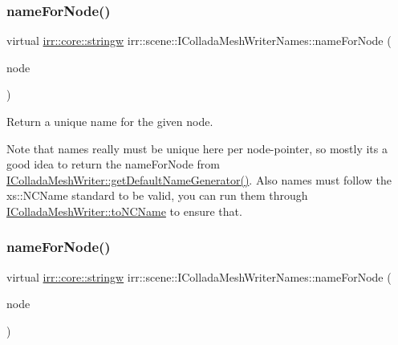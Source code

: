 \subsubsection{\texorpdfstring{name\+For\+Node()}{nameForNode()}\hspace{0.1cm}{\footnotesize\ttfamily [1/2]}}
{\footnotesize\ttfamily virtual \hyperlink{namespaceirr_1_1core_a5aedb62cb47cf01d1c548ab5e6344d2d}{irr\+::core\+::stringw} irr\+::scene\+::\+I\+Collada\+Mesh\+Writer\+Names\+::name\+For\+Node (\begin{DoxyParamCaption}\item[{const \hyperlink{classirr_1_1scene_1_1ISceneNode}{scene\+::\+I\+Scene\+Node} $\ast$}]{node }\end{DoxyParamCaption})\hspace{0.3cm}{\ttfamily [pure virtual]}}



Return a unique name for the given node. 

Note that names really must be unique here per node-\/pointer, so mostly it\textquotesingle{}s a good idea to return the name\+For\+Node from \hyperlink{classirr_1_1scene_1_1IColladaMeshWriter_acd10fcf2458271d59cf76284613288f6}{I\+Collada\+Mesh\+Writer\+::get\+Default\+Name\+Generator()}. Also names must follow the xs\+::\+N\+C\+Name standard to be valid, you can run them through \hyperlink{classirr_1_1scene_1_1IColladaMeshWriter_ac9c48beab095aa6f4cb4f696bb2ecd45}{I\+Collada\+Mesh\+Writer\+::to\+N\+C\+Name} to ensure that. \mbox{\label{classirr_1_1scene_1_1IColladaMeshWriterNames_a60d3fdad90edc25b0305c91be15b255f}} 
\subsubsection{\texorpdfstring{name\+For\+Node()}{nameForNode()}\hspace{0.1cm}{\footnotesize\ttfamily [2/2]}}
{\footnotesize\ttfamily virtual \hyperlink{namespaceirr_1_1core_a5aedb62cb47cf01d1c548ab5e6344d2d}{irr\+::core\+::stringw} irr\+::scene\+::\+I\+Collada\+Mesh\+Writer\+Names\+::name\+For\+Node (\begin{DoxyParamCaption}\item[{const \hyperlink{classirr_1_1scene_1_1ISceneNode}{scene\+::\+I\+Scene\+Node} $\ast$}]{node }\end{DoxyParamCaption})\hspace{0.3cm}{\ttfamily [pure virtual]}}



